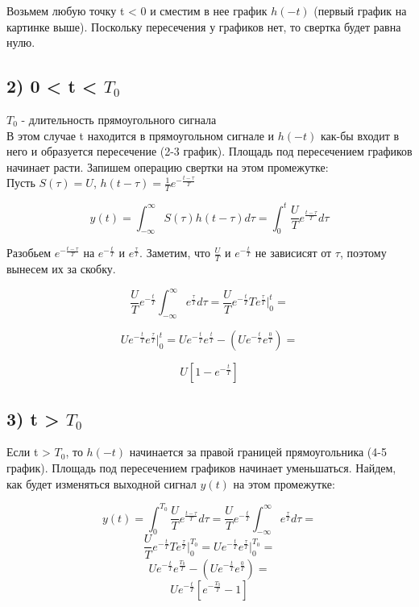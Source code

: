 Возьмем любую точку t < 0 и сместим в нее график $h(-t)$ (первый график на картинке выше). 
Поскольку пересечения у графиков нет, то свертка будет равна нулю.

\subsection*{2) 0 < t < $T_0$}

$T_0$ - длительность прямоугольного сигнала\\

В этом случае t находится в прямоугольном сигнале и $h(-t)$ как-бы входит в него и образуется пересечение (2-3 график). Площадь
под пересечением графиков начинает расти. Запишем операцию свертки на этом промежутке: \\

Пусть $S(\tau) = U$, $h(t-\tau) = \frac{1}{T}e^{-\frac{t-\tau}{T}}$

$$y(t) = \int_{-\infty}^{\infty}S(\tau)h(t-\tau)d\tau = \int_{0}^{t}\frac{U}{T}e^{\frac{t-\tau}{T}}d\tau$$

Разобьем $e^{-\frac{t-\tau}{T}}$ на $e^{-\frac{t}{T}}$ и $e^{\frac{\tau}{T}}$. Заметим, что $\frac{U}{T}$ и $e^{-\frac{t}{T}}$ 
не зависисят от $\tau$, поэтому вынесем их за скобку.

$$\frac{U}{T}e^{-\frac{t}{T}}\int_{-\infty}^{\infty}e^{\frac{\tau}{T}}d\tau = \frac{U}{T}e^{-\frac{t}{T}}Te^{\frac{\tau}{T}}\bigg|_0^t = $$

$$Ue^{-\frac{t}{T}}e^{\frac{\tau}{T}}\bigg|_0^t = Ue^{-\frac{t}{T}}e^{\frac{t}{T}} - (Ue^{-\frac{t}{T}}e^{\frac{0}{T}}) = $$

$$\boxed{U[1-e^{-\frac{t}{T}}]}$$

\subsection*{3) t > $T_0$}

Если t > $T_0$, то $h(-t)$ начинается за правой границей прямоугольника (4-5 график). Площадь под пересечением графиков начинает
уменьшаться. Найдем, как будет изменяться выходной сигнал $y(t)$ на этом промежутке:

$$y(t) = \int_{0}^{T_0}\frac{U}{T}e^{\frac{t-\tau}{T}}d\tau = \frac{U}{T}e^{-\frac{t}{T}}\int_{-\infty}^{\infty}e^{\frac{\tau}{T}}d\tau = $$
$$\frac{U}{T}e^{-\frac{t}{T}}Te^{\frac{\tau}{T}}\bigg|_0^{T_0} = Ue^{-\frac{t}{T}}e^{\frac{\tau}{T}}\bigg|_0^{T_0} = $$
$$Ue^{-\frac{t}{T}}e^{\frac{T_0}{T}} - (Ue^{-\frac{t}{T}}e^{\frac{0}{T}}) = $$
$$\boxed{Ue^{-\frac{t}{T}}[e^{-\frac{T_0}{T}} - 1]}$$


\endinput